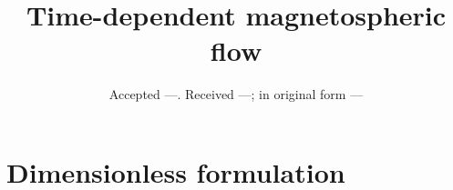 \documentclass[usenatbib]{mnras}
\title[]{Time-dependent magnetospheric flow}
\author[]{}
\begin{document}
\date{Accepted ---. Received ---; in
  original form --- }

\label{firstpage}
\pagerange{\pageref{firstpage}--\pageref{lastpage}} 
\maketitle

\begin{abstract}

\end{abstract}

\begin{keywords}
\end{keywords}

\section{Dimensionless formulation}
\end{document}
